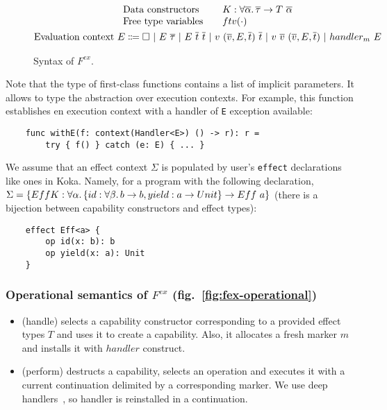 \documentclass[acmsmall]{acmart}
\newcommand{\vor}{~|~}
\newcommand{\ap}{~}
\begin{document}
\begin{figure}
\begin{gather*}
\begin{array}{lrl}
            \text{Data constructors} & & K : \forall\overline{\alpha}\ldotp \overline{\tau}\to T\ap \overline{\alpha} \\
            \text{Free type variables} & & ftv(\cdot) \\
        \end{array}\\
        \begin{aligned}
            \text{Evaluation context } E \Coloneqq \square \vor E \ap \overline{\tau} \vor E \ap \overline{t}\ap \overline{t} \vor v \ap (\overline{v}, E, \overline{t}) \ap \overline{t} \vor v \ap \overline{v} \ap (\overline{v}, E, \overline{t}) \vor handler_m ~ E
        \end{aligned}\\
    \end{gather*}
    \caption{Syntax of $F^{ex}$.}
    \label{fig:core-syntax}
\end{figure}

Note that the type of first-class functions contains a list of implicit parameters.
It allows to type the abstraction over execution contexts.
For example, this function establishes en execution context with a handler of \texttt{E} exception available:
\begin{verbatim}
    func withE(f: context(Handler<E>) () -> r): r =
        try { f() } catch (e: E) { ... }
\end{verbatim}

We assume that an effect context $\Sigma$ is populated by user's \texttt{effect} declarations like ones in Koka. %
Namely, for a program with the following declaration, $\Sigma = \{EffK : \forall\alpha\ldotp\{id : \forall\beta\ldotp b\to b, yield : a \to Unit\} \to Eff\ap a\}$ (there is a bijection between capability constructors and effect types):
\begin{verbatim}
    effect Eff<a> {
        op id(x: b): b
        op yield(x: a): Unit
    }
\end{verbatim}

\subsubsection{Operational semantics of $F^{ex}$ (fig.\ \ref{fig:fex-operational})}

\begin{itemize}
    \item (handle) selects a capability constructor corresponding to a provided effect types $T$ and uses it to create a capability.
    Also, it allocates a fresh marker $m$ and installs it with $handler$ construct.
    \item (perform) destructs a capability, selects an operation and executes it with a current continuation delimited by a corresponding marker.
    We use deep handlers~\cite{hillerstrom2018shallow}, so handler is reinstalled in a continuation.
\end{itemize}
\end{document}
